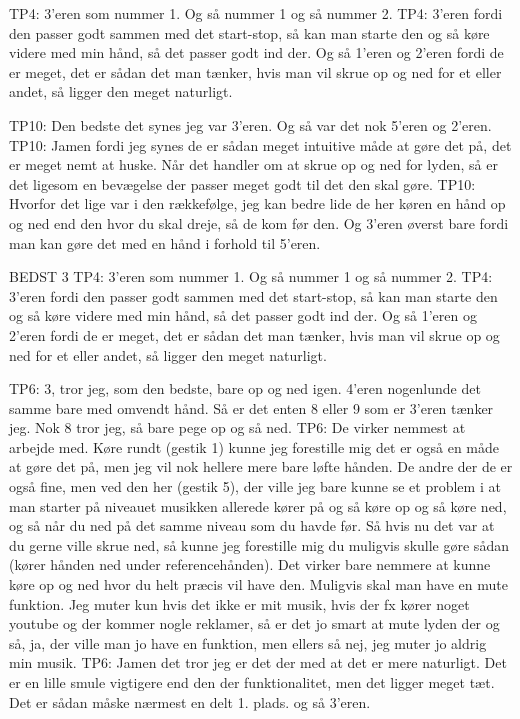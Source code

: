 TP4: 3’eren som nummer 1. Og så nummer 1 og så nummer 2.
TP4: 3’eren fordi den passer godt sammen med det start-stop, så kan man starte den og så køre videre med min hånd, så det passer godt ind der. Og så 1’eren og 2’eren fordi de er meget, det er sådan det man tænker, hvis man vil skrue op og ned for et eller andet, så ligger den meget naturligt. 

TP10: Den bedste det synes jeg var 3’eren. Og så var det nok 5’eren og 2’eren.
TP10: Jamen fordi jeg synes de er sådan meget intuitive måde at gøre det på, det er meget nemt at huske. Når det handler om at skrue op og ned for lyden, så er det ligesom en bevægelse der passer meget godt til det den skal gøre. 
TP10: Hvorfor det lige var i den rækkefølge, jeg kan bedre lide de her køren en hånd op og ned end den hvor du skal dreje, så de kom før den. Og 3’eren øverst bare fordi man kan gøre det med en hånd i forhold til 5’eren.



BEDST 3
TP4: 3’eren som nummer 1. Og så nummer 1 og så nummer 2.
TP4: 3’eren fordi den passer godt sammen med det start-stop, så kan man starte den og så køre videre med min hånd, så det passer godt ind der. Og så 1’eren og 2’eren fordi de er meget, det er sådan det man tænker, hvis man vil skrue op og ned for et eller andet, så ligger den meget naturligt. 

TP6: 3, tror jeg, som den bedste, bare op og ned igen. 4’eren nogenlunde det samme bare med omvendt hånd. Så er det enten 8 eller 9 som er 3’eren tænker jeg. Nok 8 tror jeg, så bare pege op og så ned. 
TP6: De virker nemmest at arbejde med. Køre rundt (gestik 1) kunne jeg forestille mig det er også en måde at gøre det på, men jeg vil nok hellere mere bare løfte hånden. De andre der de er også fine, men ved den her (gestik 5), der ville jeg bare kunne se et problem i at man starter på niveauet musikken allerede kører på og så køre op og så køre ned, og så når du ned på det samme niveau som du havde før. Så hvis nu det var at du gerne ville skrue ned, så kunne jeg forestille mig du muligvis skulle gøre sådan (kører hånden ned under referencehånden). Det virker bare nemmere at kunne køre op og ned hvor du helt præcis vil have den. Muligvis skal man have en mute funktion. Jeg muter kun hvis det ikke er mit musik, hvis der fx kører noget youtube og der kommer nogle reklamer, så er det jo smart at mute lyden der og så, ja, der ville man jo have en funktion, men ellers så nej, jeg muter jo aldrig min musik. 
TP6: Jamen det tror jeg er det der med at det er mere naturligt. Det er en lille smule vigtigere end den der funktionalitet, men det ligger meget tæt. Det er sådan måske nærmest en delt 1. plads. og så 3’eren.


